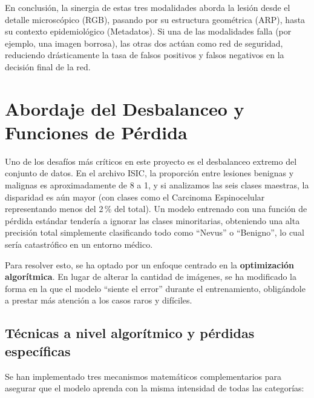 En conclusión, la sinergia de estas tres modalidades aborda la lesión desde el detalle microscópico (RGB), pasando por su estructura geométrica (ARP), hasta su contexto epidemiológico (Metadatos). Si una de las modalidades falla (por ejemplo, una imagen borrosa), las otras dos actúan como red de seguridad, reduciendo drásticamente la tasa de falsos positivos y falsos negativos en la decisión final de la red.

\section{Abordaje del Desbalanceo y Funciones de Pérdida}

Uno de los desafíos más críticos en este proyecto es el desbalanceo extremo del conjunto de datos. En el archivo ISIC, la proporción entre lesiones benignas y malignas es aproximadamente de 8 a 1, y si analizamos las seis clases maestras, la disparidad es aún mayor (con clases como el Carcinoma Espinocelular representando menos del 2\,\% del total). Un modelo entrenado con una función de pérdida estándar tendería a ignorar las clases minoritarias, obteniendo una alta precisión total simplemente clasificando todo como ``Nevus'' o ``Benigno'', lo cual sería catastrófico en un entorno médico.

Para resolver esto, se ha optado por un enfoque centrado en la \textbf{optimización algorítmica}. En lugar de alterar la cantidad de imágenes, se ha modificado la forma en la que el modelo ``siente el error'' durante el entrenamiento, obligándole a prestar más atención a los casos raros y difíciles.

\subsection{Técnicas a nivel algorítmico y pérdidas específicas}

Se han implementado tres mecanismos matemáticos complementarios para asegurar que el modelo aprenda con la misma intensidad de todas las categorías:

